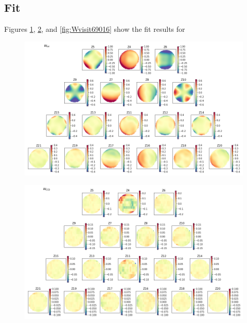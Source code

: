 \documentclass{article}
\begin{document}
\subsection{Fit}

Figures \ref{fig:Wtel}, \ref{fig:WCCD}, and \ref{fig:Wvisit69016} show the fit
results for

\begin{figure}
    \includegraphics{Wtel.png}

    \caption{}

    \label{fig:Wtel}
\end{figure}

\begin{figure}
    \includegraphics{WCCD.png}

    \caption{}

    \label{fig:WCCD}
\end{figure}
\end{document}
